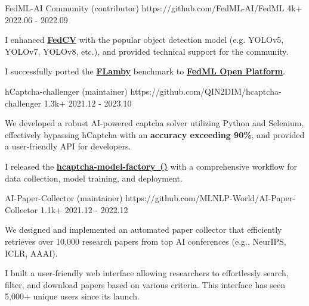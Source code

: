 
\begin{cventries}

\cvproject
{FedML-AI Community (contributor)} %
{https://github.com/FedML-AI/FedML} %
{4k+} %
{2022.06 - 2022.09} %
{
\begin{cvitems} %
\item {I enhanced \href{https://github.com/FedML-AI/FedCV}{\textbf{FedCV}} with the popular object detection model (e.g. YOLOv5, YOLOv7, YOLOv8, etc.), and provided technical support for the community.}
\item {I successfully ported the \href{https://github.com/owkin/FLamby}{\textbf{FLamby}} benchmark to \href{https://open.fedml.ai/}{\textbf{FedML Open Platform}}.}
\end{cvitems}
} %



\cvproject
{hCaptcha-challenger (maintainer)} %
{https://github.com/QIN2DIM/hcaptcha-challenger} %
{1.3k+} %
{2021.12 - 2023.10} %
{
\begin{cvitems} %
\item {We developed a robust AI-powered captcha solver utilizing Python and Selenium, effectively bypassing hCaptcha with an \textbf{accuracy exceeding 90\%}, and provided a user-friendly API for developers.}
\item {I released the \href{https://github.com/CaptchaAgent/hcaptcha-model-factory}{\textbf{hcaptcha-model-factory~()}} with a comprehensive workflow for data collection, model training, and deployment.}
\end{cvitems}
} %



\cvproject
{AI-Paper-Collector (maintainer)} %
{https://github.com/MLNLP-World/AI-Paper-Collector}
{1.1k+} %
{2021.12 - 2022.12} %
{
\begin{cvitems} %
\item {We designed and implemented an automated paper collector that efficiently retrieves over 10,000 research papers from top AI conferences (e.g., NeurIPS, ICLR, AAAI).}
\item {I built a user-friendly web interface allowing researchers to effortlessly search, filter, and download papers based on various criteria. This interface has seen 5,000+ unique users since its launch.}
\end{cvitems}
} %


\end{cventries}
